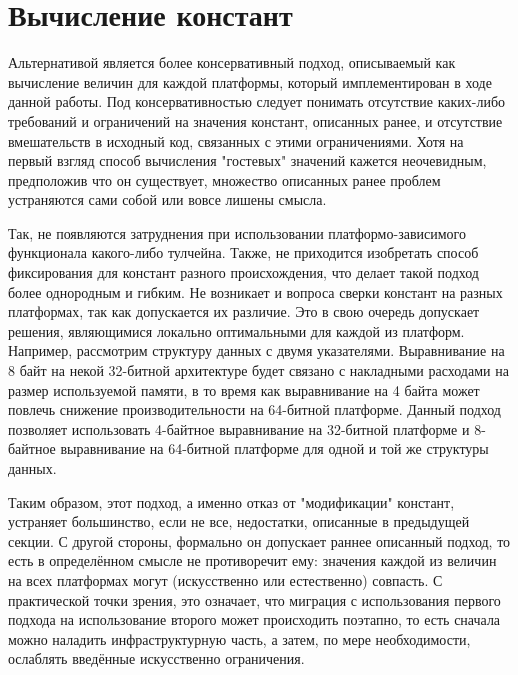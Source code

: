 \section{Вычисление констант}

Альтернативой является более консервативный подход, описываемый как вычисление величин для каждой платформы, который имплементирован в ходе данной работы.
Под консервативностью следует понимать отсутствие каких-либо требований и ограничений на значения констант, описанных ранее, и отсутствие вмешательств в исходный код, связанных с этими ограничениями. Хотя на первый взгляд способ вычисления "гостевых" значений кажется неочевидным, предположив что он существует, множество описанных ранее проблем устраняются сами собой или вовсе лишены смысла.

\par
Так, не появляются затруднения при использовании платформо-зависимого функционала какого-либо тулчейна.
Также, не приходится изобретать способ фиксирования для констант разного происхождения, что делает такой подход более однородным и гибким.
Не возникает и вопроса сверки констант на разных платформах, так как допускается их различие.
Это в свою очередь допускает решения, являющимися локально оптимальными для каждой из платформ.
Например, рассмотрим структуру данных с двумя указателями. Выравнивание на 8 байт на некой 32-битной архитектуре будет связано с накладными расходами на размер используемой памяти, в то время как выравнивание на 4 байта может повлечь снижение производительности на 64-битной платформе.
Данный подход позволяет использовать 4-байтное выравнивание на 32-битной платформе и 8-байтное выравнивание на 64-битной платформе для одной и той же структуры данных.

\par
Таким образом, этот подход, а именно отказ от "модификации" констант, устраняет большинство, если не все, недостатки, описанные в предыдущей секции.
С другой стороны, формально он допускает раннее описанный подход, то есть в определённом смысле не противоречит ему: значения каждой из величин на всех платформах могут (искусственно или естественно) совпасть.
С практической точки зрения, это означает, что миграция с использования первого подхода на использование второго может происходить поэтапно, то есть сначала можно наладить инфраструктурную часть, а затем, по мере необходимости, ослаблять введённые искусственно ограничения.

